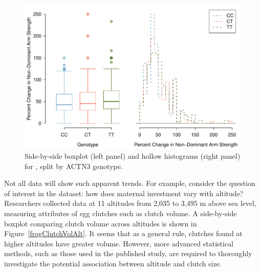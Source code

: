 \begin{doublespace}
\begin{figure}[h]
   \centering
   \includegraphics[width=\textwidth]{ch_intro_to_data_oi_biostat/figures/famussGenoMuscFunc/famussGenoMuscFunc}
   \caption{Side-by-side boxplot (left panel) and hollow histograms (right panel) for , split by ACTN3 genotype.}
   \label{famussGenoMuscFunc}
\end{figure}



Not all data will show such apparent trends. For example, consider the question of interest in the  dataset: how does maternal investment vary with altitude? Researchers collected data at 11 altitudes from 2,035 to 3,495 m above sea level, measuring attributes of egg clutches such as clutch volume. A side-by-side boxplot comparing clutch volume across altitudes is shown in Figure~\ref{frogClutchVolAlt}. It seems that as a general rule, clutches found at higher altitudes have greater volume. However, more advanced statistical methods, such as those used in the published study, are required to thoroughly investigate the potential association between altitude and clutch size. 


\end{doublespace}
